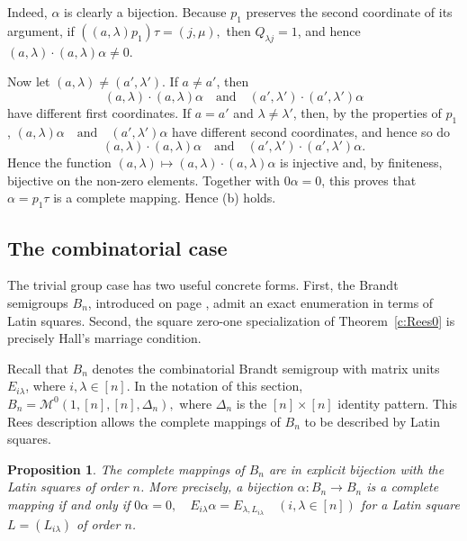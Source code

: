 \documentclass[11pt]{article}
\theoremstyle{plain}
\newtheorem{prop}[theorem]{Proposition}
\theoremstyle{remark}
\theoremstyle{definition}
\theoremstyle{plain}
\begin{document}
Indeed, $\alpha$ is clearly a bijection. Because $p_1$ preserves the second coordinate of its argument, if
\(((a,\lambda)p_1)\tau=(j,\mu),\)
then $Q_{\lambda j}=1$, and hence
\((a,\lambda)\cdot (a,\lambda)\alpha\ne 0.\)

Now let $(a,\lambda)\ne (a',\lambda')$. If $a\ne a'$, then
\[
(a,\lambda)\cdot (a,\lambda)\alpha
\quad\text{and}\quad
(a',\lambda')\cdot (a',\lambda')\alpha
\]
have different first coordinates. If $a=a'$ and $\lambda\ne\lambda'$, then, by the properties of $p_1$,
\((a,\lambda)\alpha \quad\text{and}\quad (a',\lambda')\alpha\)
have different second coordinates, and hence so do
\[
(a,\lambda)\cdot (a,\lambda)\alpha
\quad\text{and}\quad
(a',\lambda')\cdot (a',\lambda')\alpha.
\]
Hence the function
\((a,\lambda)\mapsto (a,\lambda)\cdot (a,\lambda)\alpha\)
is injective and, by finiteness, bijective on the non-zero elements. Together with $0\alpha=0$, this proves that $\alpha=p_1\tau$ is a complete mapping. Hence (b) holds.

\subsection{The combinatorial case}
The trivial group case has two useful concrete forms. First, the Brandt
semigroups $B_n$, introduced on page \pageref{brandt}, admit an exact enumeration in
terms of Latin squares. Second, the square zero-one specialization of
Theorem~\ref{c:Rees0} is precisely Hall's marriage condition.

Recall that $B_n$ denotes the combinatorial Brandt semigroup with matrix units
$E_{i\lambda}$, where $i,\lambda\in[n]$. In the notation of this section,
\(B_n=\mathcal M^0(1,[n],[n],\Delta_n),\)
where $\Delta_n$ is the $[n]\times[n]$ identity pattern. This Rees description
allows the complete mappings of $B_n$ to be described by Latin squares.

\begin{prop}\label{prop:brandt-latin}
The complete mappings of $B_n$ are in explicit bijection with the Latin squares
of order $n$. More precisely, a bijection $\alpha\colon B_n\to B_n$ is a complete
mapping if and only if
\(0\alpha=0, \quad E_{i\lambda}\alpha=E_{\lambda,L_{i\lambda}} \quad (i,\lambda\in[n])\)
for a Latin square $L=(L_{i\lambda})$ of order $n$.
\end{prop}
\end{document}
